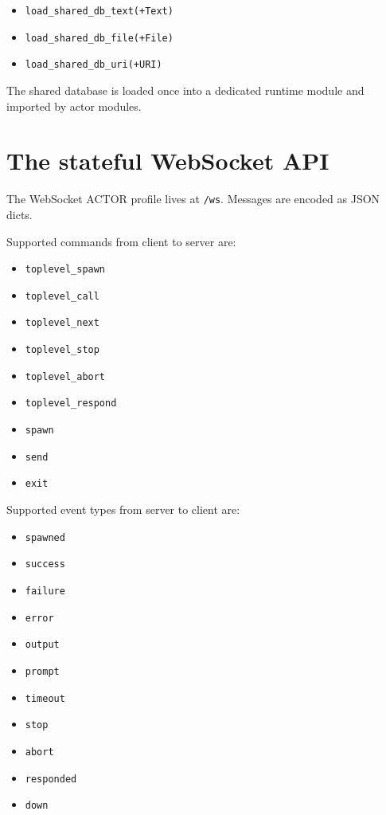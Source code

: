 \begin{itemize}
\item \texttt{load\_shared\_db\_text(+Text)}
\item \texttt{load\_shared\_db\_file(+File)}
\item \texttt{load\_shared\_db\_uri(+URI)}
\end{itemize}

\noindent The shared database is loaded once into a dedicated runtime module
and imported by actor modules.

\section{The stateful WebSocket API}\label{sec:ws-api}

\noindent The WebSocket ACTOR profile lives at \texttt{/ws}. Messages are
encoded as JSON dicts.

\medskip
\noindent Supported commands from client to server are:

\begin{itemize}
\item \texttt{toplevel\_spawn}
\item \texttt{toplevel\_call}
\item \texttt{toplevel\_next}
\item \texttt{toplevel\_stop}
\item \texttt{toplevel\_abort}
\item \texttt{toplevel\_respond}
\item \texttt{spawn}
\item \texttt{send}
\item \texttt{exit}
\end{itemize}

\noindent Supported event types from server to client are:

\begin{itemize}
\item \texttt{spawned}
\item \texttt{success}
\item \texttt{failure}
\item \texttt{error}
\item \texttt{output}
\item \texttt{prompt}
\item \texttt{timeout}
\item \texttt{stop}
\item \texttt{abort}
\item \texttt{responded}
\item \texttt{down}
\end{itemize}

